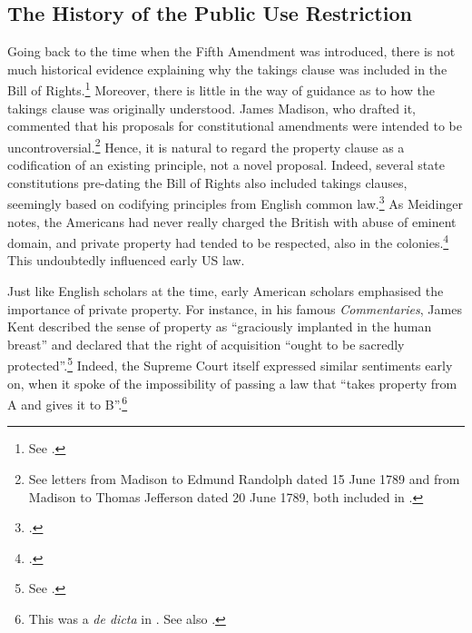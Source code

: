 \subsection{The History of the Public Use Restriction}\label{sec:hop}

Going back to the time when the Fifth Amendment was introduced, there is not much historical evidence explaining why the takings clause was included in the Bill of Rights.\footnote{See \cite{fifth}.} Moreover, there is little in the way of guidance as to how the takings clause was originally understood. James Madison, who drafted it, commented that his proposals for constitutional amendments were intended to be uncontroversial.\footnote{See letters from Madison to Edmund Randolph dated 15 June 1789 and from Madison to Thomas Jefferson dated 20 June 1789, both included in \cite{madison79}.} Hence, it is natural to regard the property clause as a codification of an existing principle, not a novel proposal. Indeed, several state constitutions pre-dating the Bill of Rights also included takings clauses, seemingly based on codifying principles from English common law.\footcite[See][299]{johnson11} As Meidinger notes, the Americans had never really charged the British with abuse of eminent domain, and private property had tended to be respected, also in the colonies.\footcite[17]{meidinger80} This undoubtedly influenced early US law.

Just like English scholars at the time, early American scholars emphasised the importance of private property. For instance, in his famous {\it Commentaries}, James Kent described the sense of property as ``graciously implanted in the human breast'' and declared that the right of acquisition ``ought to be sacredly protected''.\footnote{See \cite[see][257]{kent27}.} Indeed, the Supreme Court itself expressed similar sentiments early on, when it spoke of the impossibility of passing a law that ``takes property from A and gives it to B''.\footnote{This was a {\it de dicta} in \cite[388]{calder98}. See also \cite[310]{vanhorne95}.}

